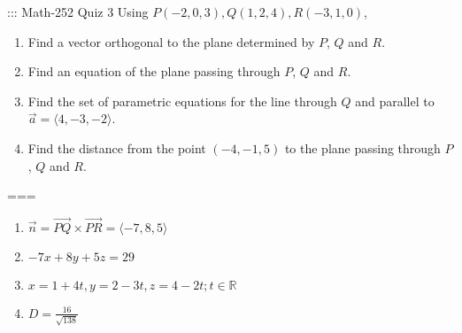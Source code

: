 ::: Math-252 Quiz 3
Using \(P(-2,0,3),Q(1,2,4),R(-3,1,0)\),
\begin{enumerate}[label=\alph*.]
  \item Find a vector orthogonal to the plane determined by \(P\), \(Q\) and \(R\).
  \item Find an equation of the plane passing through \(P\), \(Q\) and \(R\).
  \item Find the set of parametric equations for the line through $Q$ and parallel to $\vec a=\langle 4,-3,-2\rangle$.
  \item Find the distance from the point $(-4,-1,5)$ to the plane passing through \(P\), \(Q\) and \(R\).
\end{enumerate}
===
\begin{enumerate}[label=\alph*.]
  \item \(\vec n=\vec{PQ}\times\vec{PR}=\langle -7,8,5\rangle\)
  \item \(-7x+8y+5z=29\)
  \item \(x=1+4t,y=2-3t,z=4-2t;t\in\mathbb{R}\)
  \item \(D=\frac{16}{\sqrt{138}}\)
\end{enumerate}
